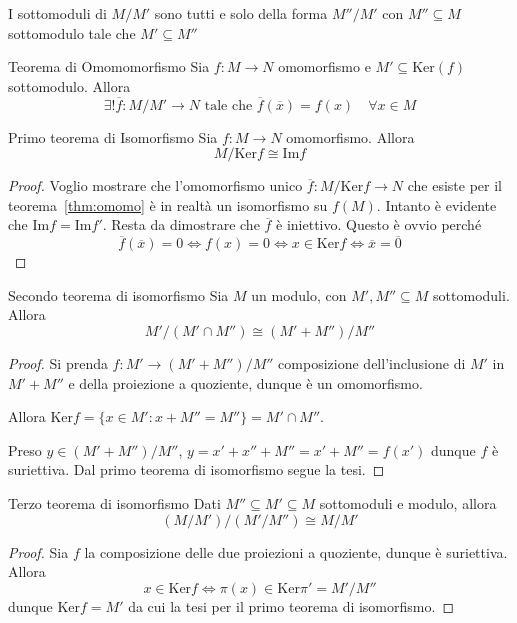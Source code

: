 \begin{proposition}{}
    I sottomoduli di \(M / M'\) sono tutti e solo della forma \(M'' / M'\) con
    \(M'' \subseteq M \) sottomodulo tale che \(M' \subseteq M'' \) 
\end{proposition}

\begin{theorem}{Teorema di Omomomorfismo}\label{thm:omomo}
    Sia \(f : M \to N\) omomorfismo e \(M' \subseteq \mathrm{Ker}{(f)} \)
    sottomodulo. Allora
    \[
      \exists ! \overline{f}: M / M' \to N \text{ tale che }
      \overline{f}{(\overline{x})} = f{(x)} \quad \forall x \in M
    \]
\end{theorem}

\begin{theorem}{Primo teorema di Isomorfismo}
    Sia \(f : M \to N\) omomorfismo. Allora
    \[M / \mathrm{Ker}f \cong \mathrm{Im}f\]
\end{theorem}
\begin{proof}{}
    Voglio mostrare che l'omomorfismo unico \(\overline{f}: M/\mathrm{Ker}f \to
    N\) che esiste per il teorema~\ref{thm:omomo} è in realtà un isomorfismo su
    \(f{(M)}\). Intanto è evidente che \(\mathrm{Im}f = \mathrm{Im}f'\). Resta
    da dimostrare che \(\overline{f}\) è iniettivo. Questo è ovvio perché 
    \[
      \overline{f}{(\overline{x})} = 0 \iff f{(x)} = 0 \iff x \in \mathrm{Ker}f
      \iff \overline{x} = \overline{0}
    \]
\end{proof}



\begin{theorem}{Secondo teorema di isomorfismo}\label{thm:iso2}
    Sia \(M\) un modulo, con \(M', M'' \subseteq M \) sottomoduli. Allora 
    \[
      M' / (M' \cap  M'') \cong {(M' + M'')} / M''
    \]
\end{theorem}
\begin{proof}{}
    Si prenda \(f : M' \to (M' + M'') / M''\) composizione dell'inclusione di \(M'\) in \(M' + M''\) e della proiezione a quoziente, dunque è un omomorfismo.

    Allora \(\mathrm{Ker} f = \{x \in M' : x + M'' = M''\} = M' \cap  M'' \).

    Preso \(y \in {(M' + M'')}/M''\), \(y = x' + x'' + M''
     = x' + M'' = f{(x')}\) dunque \(f\) è suriettiva. Dal primo
     teorema di isomorfismo segue la tesi.
\end{proof}


\begin{theorem}{Terzo teorema di isomorfismo}
    Dati \(M'' \subseteq M' \subseteq M\)  sottomoduli e modulo, allora
    \[
      {({M}/{M'})} / {(M'/ M'')} \cong M / M'
    \]
\end{theorem}
\begin{proof}{}
    Sia \(f\) la composizione delle due proiezioni a quoziente, dunque è
    suriettiva. Allora
    \[
      x \in \mathrm{Ker}f \iff \pi{(x)} \in \mathrm{Ker}\pi' = M'/M''
    \]
    dunque \(\mathrm{Ker}f  = M'\) da cui la tesi per il primo teorema di
    isomorfismo.
\end{proof}

